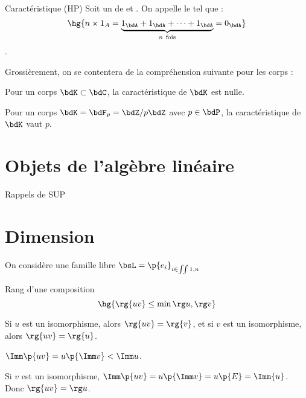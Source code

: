 \documentclass[a4paper,french,bookmarks]{book}
\begin{document}
    \begin{definition}{Caractéristique (HP)}{}
        Soit un  de  et .
        On appelle  le  tel que :
        \[ \hg{n \times 1_A = \underbrace{1_\bdA + 1_\bdA + \dots + 1_\bdA}_{n \ \text{fois}} = 0_\bdA} \]
        .
    \end{definition}
    
    Grossièrement, on se contentera de la compréhension suivante pour les corps :
    \begin{enumerate}
        \itt Pour un corps $\bdK \subset \bdC$, la caractéristique de $\bdK$ est nulle.
        
        \itt Pour un corps $\bdK = \bdF_p = \bdZ/p\bdZ$ avec $p \in \bdP$, la caractéristique de $\bdK$ vaut $p$. 
    \end{enumerate}
    
    
    \section{Objets de l'algèbre linéaire}
    
    Rappels de SUP
    
    \section{Dimension}
    
    On considère une famille libre $\bsL = \p{e_i}_{i \in \iint{1, n}}$
    
    \newpage
    
    \begin{property}{Rang d'une composition}{}
        \[ \hg{\rg{uv} \leq \min{\rg u, \rg v}}\]
        
        Si $u$ est un isomorphisme, alors $\rg{uv} = \rg{v}$, et si $v$ est un isomorphisme, alors $\rg{uv} = \rg{u}$.
    \end{property}
    
    \begin{nproof}
        $\Imm\p{uv} = u\p{\Imm v} < \Imm u$.
        
        Si $v$ est un isomorphisme, $\Imm\p{uv} = u\p{\Imm v} = u\p{E} = \Imm{u}$. Donc $\rg{uv} = \rg u$.
    \end{nproof}
    
\end{document}
